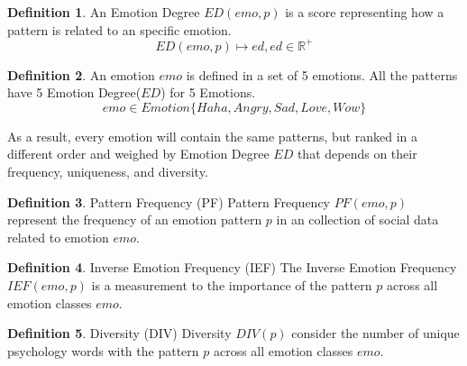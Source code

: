\documentclass[12pt,a4paper]{report}
\theoremstyle{definition}
\newtheorem{definition}{Definition}[chapter]
\begin{document}
\begin{CJK}{UTF8}{bsmi}
    \begin{definition}
    An Emotion Degree \(ED(emo,p)\) is a score representing how a pattern is related to an specific emotion.
     \[   
    ED(emo,p) \longmapsto ed, ed \in \mathbb{R^+}
    \]
    \end{definition}
    \begin{definition}
    An emotion \(emo\) is defined in a set of 5 emotions.\newline
   All the patterns have 5 Emotion Degree(\(ED\)) for 5 Emotions.
    \[
    emo \in Emotion \{Haha, Angry, Sad, Love, Wow\}
    \]
    \end{definition} 
    As a result, every emotion will contain the same patterns, but ranked in a different order and weighed by Emotion Degree \(ED\) that depends on their frequency, uniqueness, and diversity.
    
    \begin{definition}{Pattern Frequency (PF)}
    \newline
    Pattern Frequency \(PF(emo,p)\) represent the frequency of an emotion pattern \(p\) in an collection of social data related to emotion \(emo\).
    \end{definition}
    \begin{definition}{Inverse Emotion Frequency (IEF)}
    \newline
    The Inverse Emotion Frequency \(IEF(emo,p)\) is a measurement to the importance of the pattern \(p\) across all emotion classes \(emo\).
    \end{definition}
    \begin{definition}{Diversity (DIV)}
    \newline
    Diversity \(DIV(p)\) consider the number of unique psychology words with the pattern \(p\) across all emotion classes \(emo\).
    \end{definition}
    
    
    

\end{CJK}
\end{document}
